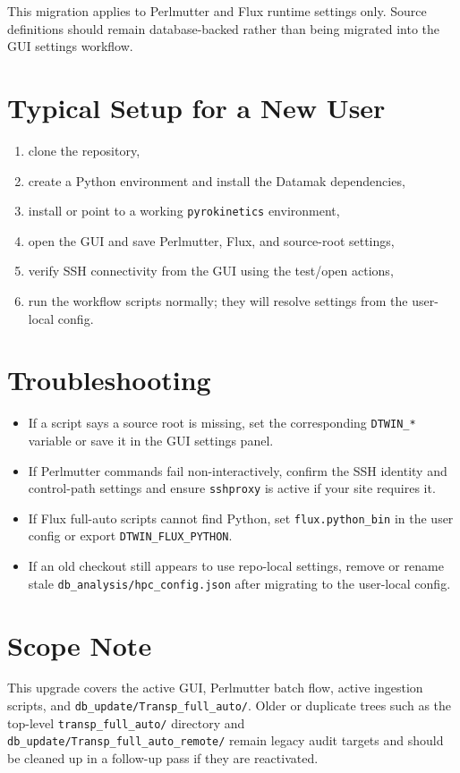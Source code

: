 \documentclass[11pt]{article}
\newcommand{\code}[1]{\texttt{#1}}
\begin{document}
This migration applies to Perlmutter and Flux runtime settings only. Source
definitions should remain database-backed rather than being migrated into the
GUI settings workflow.

\section{Typical Setup for a New User}

\begin{enumerate}
\item clone the repository,
\item create a Python environment and install the Datamak dependencies,
\item install or point to a working \code{pyrokinetics} environment,
\item open the GUI and save Perlmutter, Flux, and source-root settings,
\item verify SSH connectivity from the GUI using the test/open actions,
\item run the workflow scripts normally; they will resolve settings from the
user-local config.
\end{enumerate}

\section{Troubleshooting}

\begin{itemize}
\item If a script says a source root is missing, set the corresponding
\code{DTWIN\_*} variable or save it in the GUI settings panel.
\item If Perlmutter commands fail non-interactively, confirm the SSH identity
and control-path settings and ensure \code{sshproxy} is active if your site
requires it.
\item If Flux full-auto scripts cannot find Python, set
\code{flux.python\_bin} in the user config or export \code{DTWIN\_FLUX\_PYTHON}.
\item If an old checkout still appears to use repo-local settings, remove or
rename stale \code{db\_analysis/hpc\_config.json} after migrating to the
user-local config.
\end{itemize}

\section{Scope Note}

This upgrade covers the active GUI, Perlmutter batch flow, active ingestion
scripts, and \code{db\_update/Transp\_full\_auto/}. Older or duplicate trees
such as the top-level \code{transp\_full\_auto/} directory and
\code{db\_update/Transp\_full\_auto\_remote/} remain legacy audit targets and
should be cleaned up in a follow-up pass if they are reactivated.
\end{document}
